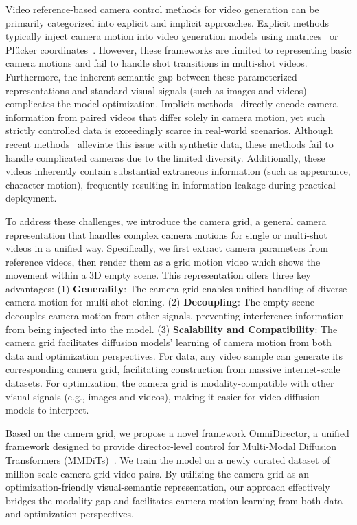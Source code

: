 \documentclass{llmxive}
\begin{document}
Video reference-based camera control methods for video generation can be primarily categorized into explicit and implicit approaches. Explicit methods~\cite{bai2025recammaster, he2024cameractrl, wu2025cinetrans, meng2026argusstackedmultiviewidentity} typically inject camera motion into video generation models using matrices~\cite{bai2025recammaster} or Plücker coordinates~\cite{he2024cameractrl}. However, these frameworks are limited to representing basic camera motions and fail to handle shot transitions in multi-shot videos. Furthermore, the inherent semantic gap between these parameterized representations and standard visual signals (such as images and videos) complicates the model optimization. 
Implicit methods~\cite{luo2025camclonemaster} directly encode camera information from paired videos that differ solely in camera motion, yet such strictly controlled data is exceedingly scarce in real-world scenarios. Although recent methods~\cite{bai2025recammaster, luo2025camclonemaster} alleviate this issue with synthetic data, these methods fail to handle complicated cameras due to the limited diversity. Additionally, these videos inherently contain substantial extraneous information (such as appearance, character motion), frequently resulting in information leakage during practical deployment. 

To address these challenges, we introduce the camera grid, a general camera representation that handles complex camera motions for single or multi-shot videos in a unified way. Specifically, we first extract camera parameters from reference videos, then render them as a grid motion video which shows the movement within a 3D empty scene. This representation offers three key advantages: (1) \textbf{Generality}: The camera grid enables unified handling of diverse camera motion for multi-shot cloning. (2) \textbf{ Decoupling}: The empty scene decouples camera motion from other signals, preventing interference information from being injected into the model. (3) \textbf{Scalability and Compatibility}: The camera grid facilitates diffusion models' learning of camera motion from both data and optimization perspectives. For data, any video sample can generate its corresponding camera grid, facilitating construction from massive internet-scale datasets. For optimization, the camera grid is modality-compatible with other visual signals (e.g., images and videos), making it easier for video diffusion models to interpret.


Based on the camera grid, we propose a novel framework OmniDirector, a unified framework designed to provide director-level control for Multi-Modal Diffusion Transformers (MMDiTs)~\cite{esser2024scaling}. We train the model on a newly curated dataset of million-scale camera grid-video pairs. By utilizing the camera grid as an optimization-friendly visual-semantic representation, our approach effectively bridges the modality gap and facilitates camera motion learning from both data and optimization perspectives. 
\end{document}
